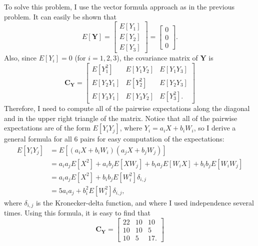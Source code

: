 \begin{problem}{10}  To solve this problem, I use the vector formula approach as in the previous problem.  It can easily be shown that
\begin{equation*}
E[\bm Y] = \begin{bmatrix} E[Y_1] \\ E[Y_2]\\ E[Y_3] \end{bmatrix} = \begin{bmatrix} 0 \\ 0 \\ 0 \end{bmatrix}.  
\end{equation*}
Also, since $E[Y_i]=0$ (for $i=1, 2, 3$), the covariance matrix of $\bm Y$ is
\begin{equation*}
\bm{C_Y}  =  \left[\begin{matrix}
    E[Y_1^2] & E[Y_1Y_2] & E[Y_1Y_3] \\
    E[Y_2 Y_1] & E[Y_2^2] & E[Y_2Y_3] \\
    E[Y_3 Y_1] & E[Y_3Y_2] & E[Y_3^2].
\end{matrix}\right] 
\end{equation*}
Therefore, I need to compute all of the pairwise expectations along the diagonal and in the upper right triangle of the matrix.  Notice that all of the pairwise expectations are of the form $E[Y_iY_j]$, where $Y_i = a_iX+b_iW_i$, so I derive a general formula for all 6 pairs for easy computation of the expectations:
\begin{align*}
E[Y_iY_j] &= E[(a_iX+b_iW_i)(a_jX+b_jW_j)] \\
&= a_i a_jE[X^2]+a_ib_jE[XW_j]+b_ia_jE[W_iX]+b_ib_jE[W_iW_j] \\
&= a_i a_jE[X^2] +b_ib_jE[W_i^2] \delta_{i, j}\\
& = 5a_i a_j+b_i^2E[W_i^2] \delta_{i, j},
\end{align*}
where $\delta_{i, j}$ is the Kronecker-delta function, and where I used independence several times.  Using this formula, it is easy to find that
\begin{equation*}
\bm{C_Y}  =  \left[\begin{matrix}
    22 & 10 & 10 \\
    10& 10 & 5 \\
    10 & 5& 17.
\end{matrix}\right] 
\end{equation*}


\end{problem}

